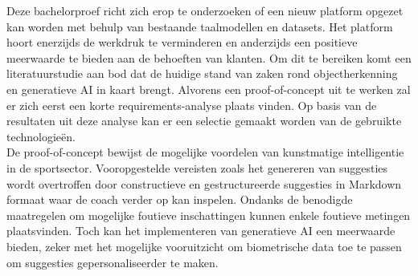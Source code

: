Deze bachelorproef richt zich erop te onderzoeken of een nieuw platform opgezet kan worden met behulp van bestaande taalmodellen en datasets.
Het platform hoort enerzijds de werkdruk te verminderen en anderzijds een positieve meerwaarde te bieden aan de behoeften van klanten.
Om dit te bereiken komt een literatuurstudie aan bod dat de huidige stand van zaken rond objectherkenning en generatieve AI in kaart brengt.
Alvorens een proof-of-concept uit te werken zal er zich eerst een korte requirements-analyse plaats vinden.
Op basis van de resultaten uit deze analyse kan er een selectie gemaakt worden van de gebruikte technologieën. \\

De proof-of-concept bewijst de mogelijke voordelen van kunstmatige intelligentie in de sportsector.
Vooropgestelde vereisten zoals het genereren van suggesties wordt overtroffen door constructieve en gestructureerde suggesties in Markdown formaat waar de coach verder op kan inspelen.
Ondanks de benodigde maatregelen om mogelijke foutieve inschattingen kunnen enkele foutieve metingen plaatsvinden.
Toch kan het implementeren van generatieve AI een meerwaarde bieden, zeker met het mogelijke vooruitzicht om biometrische data toe te passen om suggesties gepersonaliseerder te maken.